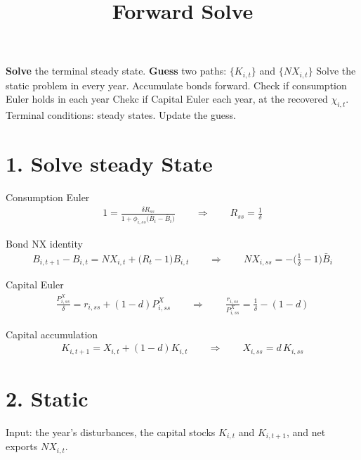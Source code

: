 \documentclass[11pt]{article}
\title{\textbf{Forward Solve}}
\author{}
\date{}
\newcommand{\st}[1]{\medskip\noindent#1\ }
\begin{document}
\maketitle
\vspace{-3.5em}



\begin{algorithm}[h]
\caption{}
\begin{algorithmic}[1]
\State \textbf{Solve} the terminal steady state.
\State \textbf{Guess} two paths: $\{K_{i,t}\}$ and $\{NX_{i,t}\}$
\Repeat
  \State Solve the static problem in every year.
  \State Accumulate bonds forward.
  \State Check if consumption Euler holds in each year
  \State Chekc if Capital Euler each year, at the recovered $\chi_{i,t}$.
  \State Terminal conditions: steady states.
  \State Update the guess.
\end{algorithmic}
\end{algorithm}

\section*{1. Solve steady State }

\st{Consumption Euler}
\begin{align}
1=\frac{\delta R_{ss}}{1+\phi_{i,ss}\big(\bar{B}_i-\bar{B}_i\big)}
\qquad\Longrightarrow\qquad
R_{ss}=\frac{1}{\delta}
\end{align}


\st{Bond NX identity}
\begin{align}
B_{i,t+1}-B_{i,t}=NX_{i,t}+\big(R_t-1\big)B_{i,t}
\qquad\Longrightarrow\qquad
NX_{i,ss}=-\Big(\tfrac{1}{\delta}-1\Big)\bar{B}_i
\end{align}


\st{Capital Euler}
\begin{align}
\frac{P^X_{i,ss}}{\delta}=r_{i,ss}+(1-d)P^X_{i,ss}
\qquad\Longrightarrow\qquad
\frac{r_{i,ss}}{P^X_{i,ss}}=\frac{1}{\delta}-(1-d)
\end{align}

\st{Capital accumulation}
\begin{align}
K_{i,t+1}=X_{i,t}+(1-d)K_{i,t}
\qquad\Longrightarrow\qquad
X_{i,ss}=d\,K_{i,ss}
\end{align}
\section*{2. Static }
\noindent Input: the year's disturbances, the capital stocks $K_{i,t}$ and $K_{i,t+1}$, and
net exports $NX_{i,t}$.
 
\end{document}
